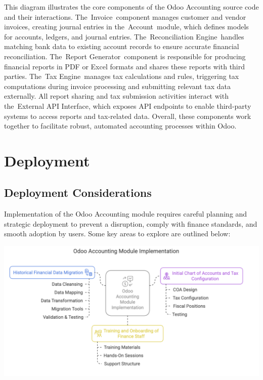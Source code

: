 \documentclass[11pt,a4paper]{article}
\begin{document}
\noindent This diagram illustrates the core components of the Odoo Accounting source code and their interactions. The Invoice component manages customer and vendor invoices, creating journal entries in the Account module, which defines models for accounts, ledgers, and journal entries. The Reconciliation Engine handles matching bank data to existing account records to ensure 
accurate financial reconciliation. The Report Generator component is responsible for producing financial reports in PDF or Excel formats and shares these reports with third parties. The Tax Engine manages tax calculations and rules, triggering tax computations during invoice 
processing and submitting relevant tax data externally. All report sharing and tax submission 
activities interact with the External API Interface, which exposes API endpoints to enable 
third-party systems to access reports and tax-related data. Overall, these components work 
together to facilitate robust, automated accounting processes within Odoo.

\newpage
\section{Deployment}
\subsection{Deployment Considerations}
Implementation of the Odoo Accounting module requires careful planning and strategic 
deployment to prevent a disruption, comply with finance standards, and smooth adoption by 
users. Some key areas to explore are outlined below:

\begin{center}
    \includegraphics[width=0.8\linewidth]{diagram/odoo_accounting_module_implementation.png}
\end{center}
\end{document}
